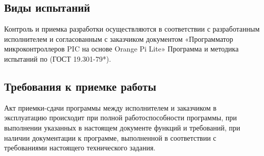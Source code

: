 \subsection{Виды испытаний}
Контроль и приемка разработки осуществляются в соответствии с разработанным исполнителем и согласованным с заказчиком документом «Программатор микроконтроллеров PIC на основе Orange Pi Lite» Программа и методика испытаний по (ГОСТ 19.301-79*).

\subsection{Требования к приемке работы}
Акт приемки-сдачи программы между исполнителем и заказчиком в эксплуатацию происходит при полной работоспособности программы, при выполнении указанных в настоящем документе функций и требований, при наличии документации к программе, выполненной в соответствии с требованиями настоящего технического задания.